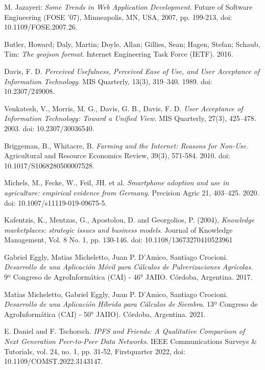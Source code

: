 \documentclass[]{llncs}
\begin{document}
\begin{thebibliography}{8}
 M. Jazayeri: \textit{Some Trends in Web Application Development}. Future of Software Engineering (FOSE '07), Minneapolis, MN, USA, 2007, pp. 199-213, doi: 10.1109/FOSE.2007.26.

 Butler, Howard; Daly, Martin; Doyle, Allan; Gillies, Sean; Hagen, Stefan; Schaub, Tim: \textit{The geojson format}. Internet Engineering Task Force (IETF). 2016.

 Davis, F. D. \textit{Perceived Usefulness, Perceived Ease of Use, and User Acceptance of Information Technology}. MIS Quarterly, 13(3), 319–340. 1989. doi: 10.2307/249008.

 Venkatesh, V., Morris, M. G., Davis, G. B., Davis, F. D. \textit{User Acceptance of Information Technology: Toward a Unified View}. MIS Quarterly, 27(3), 425–478. 2003. doi: 10.2307/30036540.

 Briggeman, B., Whitacre, B. \textit{Farming and the Internet: Reasons for Non-Use}. Agricultural and Resource Economics Review, 39(3), 571-584. 2010. doi: 10.1017/S1068280500007528.

 Michels, M., Fecke, W., Feil, JH. et al. \textit{Smartphone adoption and use in agriculture: empirical evidence from Germany}. Precision Agric 21, 403–425. 2020. doi: 10.1007/s11119-019-09675-5.

 Kafentzis, K., Mentzas, G., Apostolou, D. and Georgolios, P. (2004), \textit{Knowledge marketplaces: strategic issues and business models}. Journal of Knowledge Management, Vol. 8 No. 1, pp. 130-146. doi: 10.1108/13673270410523961

 Gabriel Eggly, Matias Micheletto, Juan P. D'Amico, Santiago Crocioni. \textit{Desarrollo de una Aplicación Móvil para Cálculos de Pulverizaciones Agrícolas}. 9º Congreso de AgroInformática (CAI) - 46° JAIIO. Córdoba, Argentina. 2017.

 Matias Micheletto, Gabriel Eggly, Juan P. D'Amico, Santiago Crocioni. \textit{Desarrollo de una Aplicación Híbrida para Cálculos de Siembra}. 13º Congreso de AgroInformática (CAI) - 50° JAIIO). Córdoba, Argentina. 2021.

 E. Daniel and F. Tschorsch. \textit{IPFS and Friends: A Qualitative Comparison of Next Generation Peer-to-Peer Data Networks}. IEEE Communications Surveys \& Tutorials, vol. 24, no. 1, pp. 31-52, Firstquarter 2022, doi: 10.1109/COMST.2022.3143147.


\end{thebibliography}
\end{document}
